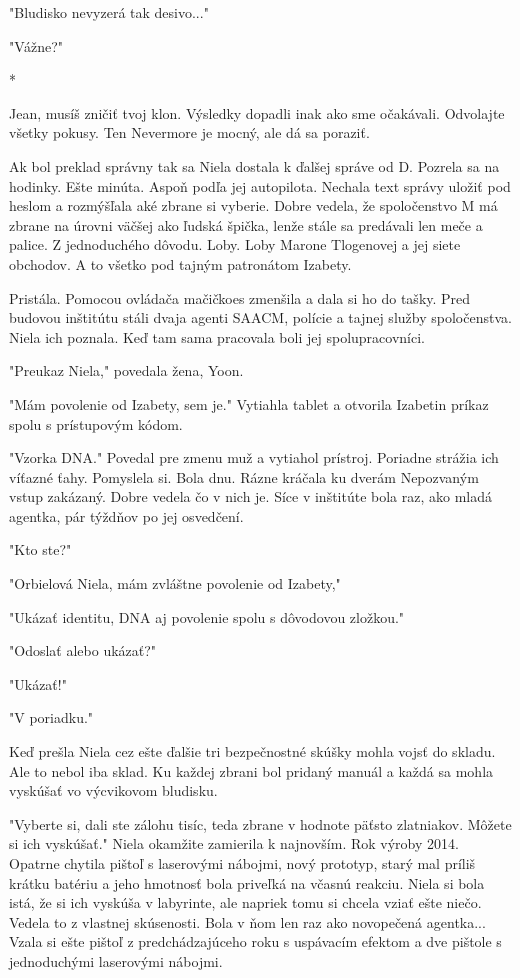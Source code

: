 \documentclass{book}
\begin{document}
"$ $Bludisko nevyzerá tak desivo..."

"$ $Vážne?"

\begin{center}
*
\end{center}

Jean, musíš zničiť tvoj klon. Výsledky dopadli inak ako sme očakávali. Odvolajte všetky pokusy. Ten Nevermore je mocný, ale dá sa poraziť.

Ak bol preklad správny tak sa Niela dostala k ďalšej správe od D. Pozrela sa na hodinky. Ešte minúta. Aspoň podľa jej autopilota. Nechala text správy uložiť pod heslom a rozmýšľala aké zbrane si vyberie. Dobre vedela, že spoločenstvo M má zbrane na úrovni väčšej ako ľudská špička, lenže stále sa predávali len meče a palice. Z jednoduchého dôvodu. Loby. Loby Marone Tlogenovej a jej siete obchodov. A to všetko pod tajným patronátom Izabety.

Pristála. Pomocou ovládača mačičkoes zmenšila a dala si ho do tašky. Pred budovou inštitútu stáli dvaja agenti SAACM, polície a tajnej služby spoločenstva. Niela ich poznala. Keď tam sama pracovala boli jej spolupracovníci.

"$ $Preukaz Niela,"$ $ povedala žena, Yoon.

"$ $Mám povolenie od Izabety, sem je."$ $ Vytiahla tablet a otvorila Izabetin príkaz spolu s prístupovým kódom.

"$ $Vzorka DNA."$ $ Povedal pre zmenu muž a vytiahol prístroj. Poriadne strážia ich víťazné ťahy. Pomyslela si. Bola dnu. Rázne kráčala ku dverám Nepozvaným vstup zakázaný. Dobre vedela čo v nich je. Síce v inštitúte bola raz, ako mladá agentka, pár týždňov po jej osvedčení.

"$ $Kto ste?"

"$ $Orbielová Niela, mám zvláštne povolenie od Izabety,"

"$ $Ukázať identitu, DNA aj povolenie spolu s dôvodovou zložkou."

"$ $Odoslať alebo ukázať?"

"$ $Ukázať!"

"$ $V poriadku."

Keď prešla Niela cez ešte ďalšie tri bezpečnostné skúšky mohla vojsť do skladu. Ale to nebol iba sklad. Ku každej zbrani bol pridaný manuál a každá sa mohla vyskúšať vo výcvikovom bludisku.

"$ $Vyberte si, dali ste zálohu tisíc, teda zbrane v hodnote päťsto zlatniakov. Môžete si ich vyskúšať."$ $ Niela okamžite zamierila k najnovším. Rok výroby 2014. Opatrne chytila pištoľ s laserovými nábojmi, nový prototyp, starý mal príliš krátku batériu a jeho hmotnosť bola priveľká na včasnú reakciu. Niela si bola istá, že si ich vyskúša v labyrinte, ale napriek tomu si chcela vziať ešte niečo. Vedela to z vlastnej skúsenosti. Bola v ňom len raz ako novopečená agentka... Vzala si ešte pištoľ z predchádzajúceho roku s uspávacím efektom a dve pištole s jednoduchými laserovými nábojmi.
\end{document}
